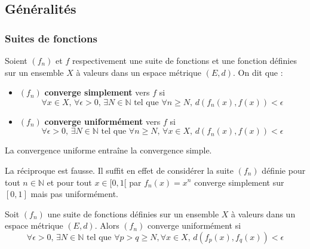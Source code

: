 




	\subsection{Généralités}
	
	\subsubsection{Suites de fonctions}
	
	
	\begin{definition}
		Soient $(f_n)$ et $f$ respectivement une suite de fonctions et une fonction définies sur un ensemble $X$ à valeurs dans un espace métrique $(E, d)$. On dit que :
		\begin{itemize}
			\item $(f_n)$ \textbf{converge simplement} vers $f$ si
			\[ \forall x \in X, \, \forall \epsilon > 0, \, \exists N \in \mathbb{N} \text{ tel que } \forall n \geq N, \, d(f_n(x), f(x)) < \epsilon \]
			\item $(f_n)$ \textbf{converge uniformément} vers $f$ si
			\[ \forall \epsilon > 0, \, \exists N \in \mathbb{N} \text{ tel que } \forall n \geq N, \, \forall x \in X, \, d(f_n(x), f(x)) < \epsilon \]
		\end{itemize}
	\end{definition}
	
	\begin{proposition}
		La convergence uniforme entraîne la convergence simple.
	\end{proposition}
	
	\begin{cexample}
		La réciproque est fausse. Il suffit en effet de considérer la suite $(f_n)$ définie pour tout $n \in \mathbb{N}$ et pour tout $x \in [0,1[$ par $f_n(x) = x^n$ converge simplement sur $[0,1]$ mais pas uniformément.
	\end{cexample}
	
	\begin{theorem}
		Soit $(f_n)$ une suite de fonctions définies sur un ensemble $X$ à valeurs dans un espace métrique $(E, d)$. Alors $(f_n)$ converge uniformément si
		\[ \forall \epsilon > 0, \, \exists N \in \mathbb{N} \text{ tel que } \forall p > q \geq N, \forall x \in X, \, d(f_p(x), f_q(x)) < \epsilon \]
	\end{theorem}
	
